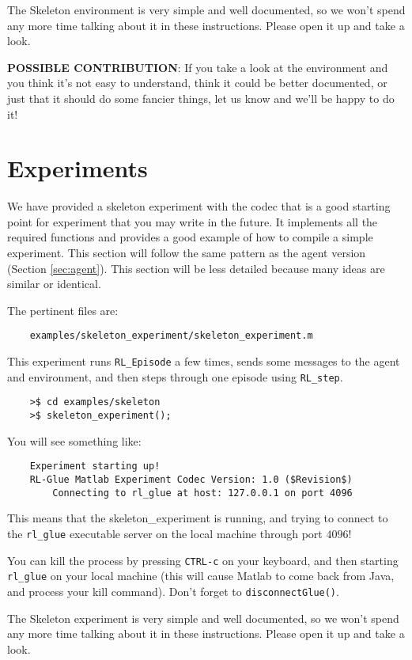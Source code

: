 \documentclass[11pt]{article}
\begin{document}
The Skeleton environment is very simple and well documented, so we won't spend any more time talking about it in these instructions.
Please open it up and take a look.

\textbf{POSSIBLE CONTRIBUTION}: If you take a look at the environment and you think it's not easy to understand, think it could be better documented, 
or just that it should do some fancier things, let us know and we'll be happy to do it!


\section{Experiments}
We have provided a skeleton experiment with the codec that is a good starting point for experiment that you may write in the future.
It implements all the required functions and provides a good example of how to compile a simple experiment.  This section will follow the same 
pattern as the agent version (Section \ref{sec:agent}).  This section will be less detailed because many ideas are similar or identical.

The pertinent files are:
\begin{verbatim}
	examples/skeleton_experiment/skeleton_experiment.m
\end{verbatim}

This experiment runs \texttt{RL\_Episode} a few times, sends some messages to the agent and environment, and then steps through one episode using \texttt{RL\_step}.

\begin{verbatim}
	>$ cd examples/skeleton
	>$ skeleton_experiment();
\end{verbatim}

You will see something like:
\begin{verbatim}
	Experiment starting up!
	RL-Glue Matlab Experiment Codec Version: 1.0 ($Revision$)
	    Connecting to rl_glue at host: 127.0.0.1 on port 4096
\end{verbatim}

This means that the skeleton\_experiment is running, and trying to connect to the \texttt{rl\_glue} executable server on the local machine through port $4096$!  

You can kill the process by pressing \texttt{CTRL-c} on your keyboard, and then starting  \texttt{rl\_glue} on your local machine (this will cause Matlab to come back from Java, and 
process your kill command).  Don't forget to \texttt{disconnectGlue()}.

The Skeleton experiment is very simple and well documented, so we won't spend any more time talking about it in these instructions.
Please open it up and take a look.
\end{document}
